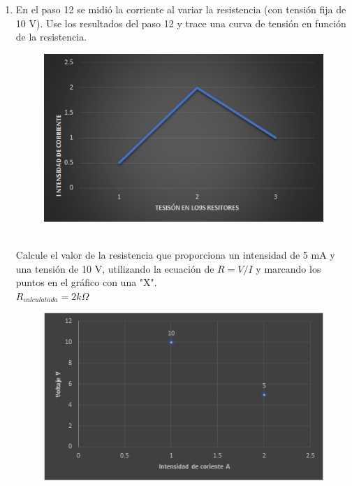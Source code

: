 \begin{enumerate}
\begin{figure}[h]
	\end{figure}
	\item En el paso 12  se midió la corriente al variar la resistencia (con  tensión fija de 10 V). Use los resultados del paso 12 y trace una curva de tensión en función de la resistencia.
	\begin{figure}[h]
		\centering
		\includegraphics[scale=0.9]{imagenes/3}
	\end{figure}
	\\ Calcule el valor de la resistencia que proporciona un intensidad de 5 mA y una tensión de 10 V, utilizando la ecuación de $R=V/I$ y marcando los puntos en el gráfico con una "X". 
	\\$R_{calculatada}=2k\Omega$ 
	\begin{figure}[h]
		\centering
		\includegraphics[scale=1]{imagenes/4}
	\end{figure}
	\end{enumerate}
